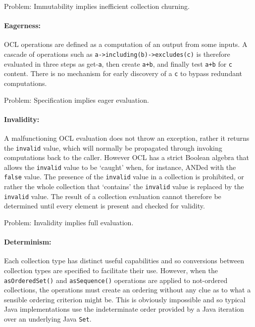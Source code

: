\documentclass{llncs}
\begin{document}
Problem: Immutability implies inefficient collection churning.

\paragraph{Eagerness:}

OCL operations are defined as a computation of an output from some inputs. A cascade of operations such as \verb$a->including(b)->excludes(c)$ is therefore evaluated in three steps as get-\verb$a$, then create \verb$a+b$, and finally test \verb$a+b$ for \verb$c$ content. There is no mechanism for early discovery of a \verb$c$ to bypass redundant computations.

Problem: Specification implies eager evaluation.

\paragraph{Invalidity:}

A malfunctioning OCL evaluation does not throw an exception, rather it returns the \verb$invalid$ value, which will normally be propagated through invoking computations back to the caller. However OCL has a strict Boolean algebra that allows the \verb$invalid$ value to be `caught' when, for instance, ANDed with the \verb$false$ value. The presence of the \verb$invalid$ value in a collection is prohibited, or rather the whole collection that `contains' the \verb$invalid$ value is replaced by the \verb$invalid$ value. The result of a collection evaluation cannot therefore be determined until every element is present and checked for validity.

Problem: Invalidity implies full evaluation.

\paragraph{Determinism:}

Each collection type has distinct useful capabilities and so conversions between collection types are specified to facilitate their use. However, when the \verb$asOrderedSet()$ and \verb$asSequence()$ operations are applied to not-ordered collections, the operations must create an ordering without any clue as to what a sensible ordering criterion might be. This is obviously impossible and so typical Java implementations use the indeterminate order provided by a Java iteration over an underlying Java \verb$Set$.
\end{document}
